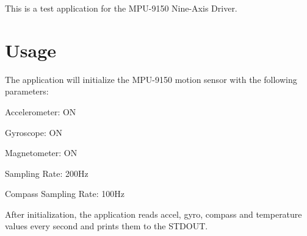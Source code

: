 This is a test application for the M\+P\+U-\/9150 Nine-\/\+Axis Driver.

\section*{Usage}

The application will initialize the M\+P\+U-\/9150 motion sensor with the following parameters\+:
\begin{DoxyItemize}
\item Accelerometer\+: ON
\item Gyroscope\+: ON
\item Magnetometer\+: ON
\item Sampling Rate\+: 200\+Hz
\item Compass Sampling Rate\+: 100\+Hz
\end{DoxyItemize}

After initialization, the application reads accel, gyro, compass and temperature values every second and prints them to the S\+T\+D\+O\+UT. 